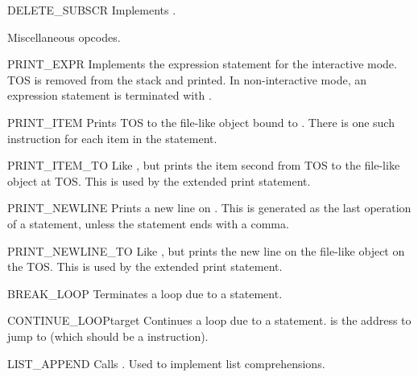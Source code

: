 \begin{opcodedesc}{DELETE_SUBSCR}{}
Implements .
\end{opcodedesc}

Miscellaneous opcodes.

\begin{opcodedesc}{PRINT_EXPR}{}
Implements the expression statement for the interactive mode.  TOS is
removed from the stack and printed.  In non-interactive mode, an
expression statement is terminated with .
\end{opcodedesc}

\begin{opcodedesc}{PRINT_ITEM}{}
Prints TOS to the file-like object bound to .  There
is one such instruction for each item in the  statement.
\end{opcodedesc}

\begin{opcodedesc}{PRINT_ITEM_TO}{}
Like , but prints the item second from TOS to the
file-like object at TOS.  This is used by the extended print statement.
\end{opcodedesc}

\begin{opcodedesc}{PRINT_NEWLINE}{}
Prints a new line on .  This is generated as the
last operation of a  statement, unless the statement
ends with a comma.
\end{opcodedesc}

\begin{opcodedesc}{PRINT_NEWLINE_TO}{}
Like , but prints the new line on the file-like
object on the TOS.  This is used by the extended print statement.
\end{opcodedesc}

\begin{opcodedesc}{BREAK_LOOP}{}
Terminates a loop due to a  statement.
\end{opcodedesc}

\begin{opcodedesc}{CONTINUE_LOOP}{target}
Continues a loop due to a  statement.  
is the address to jump to (which should be a 
instruction).
\end{opcodedesc}

\begin{opcodedesc}{LIST_APPEND}{}
Calls .  Used to implement list comprehensions.
\end{opcodedesc}

